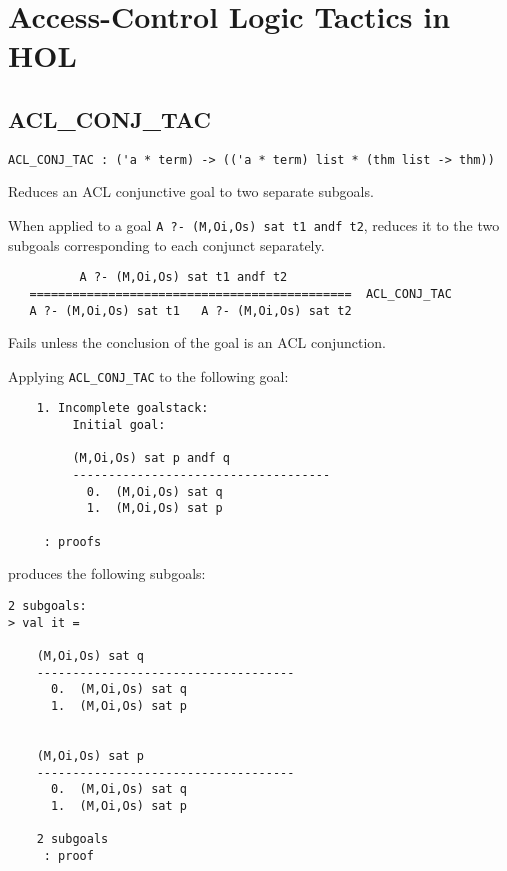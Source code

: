 
\chapter{Access-Control Logic Tactics in HOL}
\label{cha:access-control-logic-tactics}

\section{ACL\_CONJ\_TAC}
\label{sec:acl-conj-tac}


\small{
\begin{lstlisting}[breaklines]
ACL_CONJ_TAC : ('a * term) -> (('a * term) list * (thm list -> thm))
\end{lstlisting}}\egroup

\SYNOPSIS
Reduces an ACL conjunctive goal to two separate subgoals.

\DESCRIBE
When applied to a goal \texttt{A ?- (M,Oi,Os) sat t1 andf t2}, reduces it to the two subgoals corresponding to each conjunct separately.
\begin{verbatim}
          A ?- (M,Oi,Os) sat t1 andf t2
   =============================================  ACL_CONJ_TAC
   A ?- (M,Oi,Os) sat t1   A ?- (M,Oi,Os) sat t2
\end{verbatim}

\FAILURE
Fails unless the conclusion of the goal is an ACL conjunction.

\EXAMPLE
Applying \texttt{ACL\_CONJ\_TAC} to the following goal:
\begin{holboxed}
\begin{verbatim}
    1. Incomplete goalstack:
         Initial goal:
    
         (M,Oi,Os) sat p andf q
         ------------------------------------
           0.  (M,Oi,Os) sat q
           1.  (M,Oi,Os) sat p
    
     : proofs
\end{verbatim}
\end{holboxed}
produces the following subgoals:
\begin{holboxed}
\begin{verbatim}
2 subgoals:
> val it =
    
    (M,Oi,Os) sat q
    ------------------------------------
      0.  (M,Oi,Os) sat q
      1.  (M,Oi,Os) sat p
    
    
    (M,Oi,Os) sat p
    ------------------------------------
      0.  (M,Oi,Os) sat q
      1.  (M,Oi,Os) sat p
    
    2 subgoals
     : proof
\end{verbatim}
\end{holboxed}

